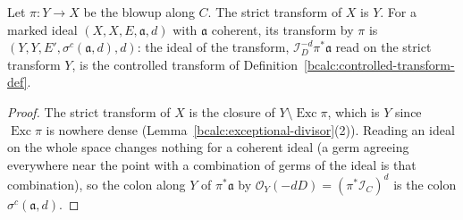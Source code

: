 \begin{lemma}[Transforms with \(N=X\)]
\label{bcalc:transform-ambient}
\mixedleanok
Let \(\pi\colon Y\to X\) be the blowup along \(C\). The strict transform of \(X\) is \(Y\). For a marked ideal \((X,X,E,\mathfrak a,d)\)
with \(\mathfrak a\) coherent, its transform by \(\pi\) is \((Y,Y,E',\sigma^{c}(\mathfrak a,d),d)\): the ideal of the transform,
\(\mathcal I_D^{-d}\pi^*\mathfrak a\) read on the strict transform \(Y\), is the controlled transform of
Definition~\ref{bcalc:controlled-transform-def}.
\end{lemma}
\begin{proof}
\mixedleanok
The strict transform of \(X\) is the closure of \(Y\setminus\operatorname{Exc}\pi\), which is \(Y\) since \(\operatorname{Exc}\pi\)
is nowhere dense (Lemma~\ref{bcalc:exceptional-divisor}(2)). Reading an ideal on the whole space changes nothing for a coherent
ideal (a germ agreeing everywhere near the point with a combination of germs of the ideal is that combination), so the colon
along \(Y\) of \(\pi^*\mathfrak a\) by \(\mathcal O_Y(-dD)=(\pi^*\mathcal I_C)^{d}\) is the colon \(\sigma^{c}(\mathfrak a,d)\).
\end{proof}

